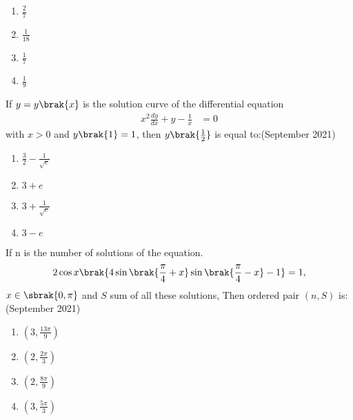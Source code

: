 \begin{multicols}{2}

\begin{enumerate}

    \item $\frac{2}{7}$ \\
    \item $\frac{1}{18}$ 
    \item $\frac{1}{7}$ \\
    \item $\frac{1}{9}$
\end{enumerate}
\end{multicols}

\item If $y = y\brak{x}$ is the solution curve of the differential equation
\begin{align*}
x^{2} \frac{dy}{dx} + y - \frac{1}{x} &= 0
\end{align*}
with $x>0$ and $y\brak{1}= 1$, then $y\brak{\frac{1}{2}}$ is equal to:\hfill (September 2021)
\begin{multicols}{2}
\begin{enumerate}
    \item $\frac{3}{2}-\frac{1}{\sqrt{e}}$\\
  
    \item $3 + e$
     \item $3 + \frac{1}{\sqrt{e}}$ \\
    \item $3 - e$
\end{enumerate}
\end{multicols}
\item If n is the number of solutions of the equation.\\
\begin{align*}
2 \cos{x}\brak{4\sin{\brak{\frac{\pi}{4} + x}}\sin{\brak{\frac{\pi}{4}-x}}-1}&=1,\\
\end{align*} $x \in \sbrak{0, \pi}$ and $S$ sum of all these solutions, Then ordered pair $(n, S)$ is:\hfill (September 2021)
\begin{multicols}{4}
\begin{enumerate}

    \item $(3, \frac{13\pi}{9})$
    \item $(2, \frac{2\pi}{3})$
    \item $(2, \frac{8\pi}{9})$
    \item $(3, \frac{5\pi}{3})$
\end{enumerate}
\end{multicols}

